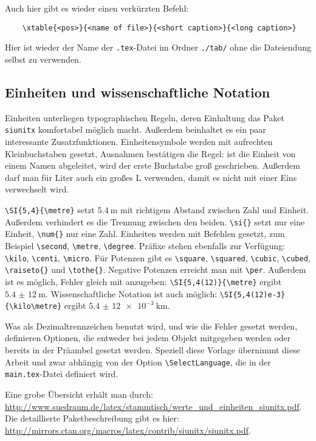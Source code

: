 Auch hier gibt es wieder einen verkürzten Befehl:
\begin{verbatim}
	\xtable{<pos>}{<name of file>}{<short caption>}{<long caption>}
\end{verbatim}
Hier ist wieder der Name der \verb|.tex|-Datei im Ordner \verb|./tab/| ohne die Dateiendung selbst zu verwenden.


\subsection{Einheiten und wissenschaftliche Notation}
Einheiten unterliegen typographischen Regeln, deren Einhaltung das Paket \verb|siunitx| komfortabel möglich macht. Außerdem beinhaltet es ein paar interessante Zusatzfunktionen. Einheitensymbole werden mit aufrechten Kleinbuchstaben gesetzt, Ausnahmen bestätigen die Regel: ist die Einheit von einem Namen abgeleitet, wird der erste Buchstabe groß geschrieben. Außerdem darf man für Liter auch ein großes L verwenden, damit es nicht mit einer Eins verwechselt wird.

\verb|\SI{5,4}{\metre}| setzt $\SI{5,4}{\metre}$ mit richtigem Abstand zwischen Zahl und Einheit. Außerdem verhindert es die Trennung zwischen den beiden. \verb|\si{}| setzt nur eine Einheit, \verb|\num{}| nur eine Zahl. Einheiten werden mit Befehlen gesetzt, zum Beispiel \verb|\second|, \verb|\metre|, \verb|\degree|. Präfixe stehen ebenfalls zur Verfügung: \verb|\kilo|, \verb|\centi|, \verb|\micro|. Für Potenzen gibt es \verb|\square|, \verb|\squared|, \verb|\cubic|, \verb|\cubed|, \verb|\raiseto{}| und \verb|\tothe{}|. Negative Potenzen erreicht man mit \verb|\per|. Außerdem ist es möglich, Fehler gleich mit anzugeben: \verb|\SI{5,4(12)}{\metre}| ergibt $\SI{5,4(12)}{\metre}$. Wissenschaftliche Notation ist auch möglich: \verb|\SI{5,4(12)e-3}{\kilo\metre}| ergibt $\SI{5,4(12)e-3}{\kilo\metre}$.

Was als Dezimaltrennzeichen benutzt wird, und wie die Fehler gesetzt werden, definieren Optionen, die entweder bei jedem Objekt mitgegeben werden oder bereits in der Präambel gesetzt werden. Speziell diese Vorlage übernimmt diese Arbeit und zwar abhängig von der Option \verb|\SelectLanguage|, die in der \verb|main.tex|-Datei definiert wird.

Eine grobe Übersicht erhält man durch: 
\url{http://www.suedraum.de/latex/stammtisch/werte_und_einheiten_siunitx.pdf}. 
Die detaillierte Paketbeschreibung gibt es hier: 
\url{http://mirrors.ctan.org/macros/latex/contrib/siunitx/siunitx.pdf}.


